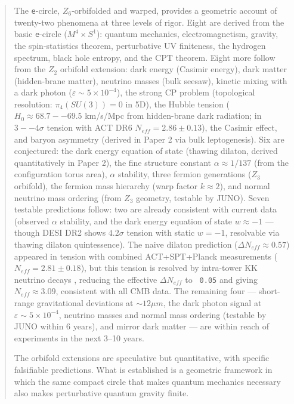 \documentclass[aps,prd,preprint,superscriptaddress,longbibliography,floatfix]{revtex4-2}
\theoremstyle{remark}
\begin{document}
\begin{abstract}
The \texttt{e}-circle, $Z_{6}$-orbifolded and warped, provides a geometric account of twenty-two phenomena at three levels of rigor. Eight are derived from the basic \texttt{e}-circle ($M^{4} \times S^{1}$): quantum mechanics, electromagnetism, gravity, the spin-statistics theorem, perturbative UV finiteness, the hydrogen spectrum, black hole entropy, and the CPT theorem. Eight more follow from the $Z_{2}$ orbifold extension: dark energy (Casimir energy), dark matter (hidden-brane matter), neutrino masses (bulk seesaw), kinetic mixing with a dark photon ($\varepsilon \sim  5 \times 10^{-4}$), the strong CP problem (topological resolution: $\pi_{4}(SU(3)) = 0$ in 5D), the Hubble tension ($H_{0} \approx 68.7--69.5$ km/s/Mpc from hidden-brane dark radiation; in $3--4\sigma$ tension with ACT DR6 $N_{eff} = 2.86 \pm 0.13$), the Casimir effect, and baryon asymmetry (derived in Paper 2 via bulk leptogenesis). Six are conjectured: the dark energy equation of state (thawing dilaton, derived quantitatively in Paper 2), the fine structure constant $\alpha \approx 1/137$ (from the configuration torus area), $\alpha$ stability, three fermion generations ($Z_{3}$ orbifold), the fermion mass hierarchy (warp factor $k \approx 2$), and normal neutrino mass ordering (from $Z_{3}$ geometry, testable by JUNO). Seven testable predictions follow: two are already consistent with current data (observed $\alpha$ stability, and the dark energy equation of state $w \approx -1$ --- though DESI DR2 shows $4.2\sigma$ tension with static $w = -1$, resolvable via thawing dilaton quintessence). The naive dilaton prediction ($\Delta N_{eff} \approx 0.57$) appeared in tension with combined ACT+SPT+Planck measurements ($N_{eff} = 2.81 \pm 0.18$), but this tension is resolved by intra-tower KK neutrino decays \cite{GonzaloNeutrinoTowers2024}, reducing the effective $\Delta N_{eff}$ to \texttt{~0.05} and giving $N_{eff} \approx 3.09$, consistent with all CMB data. The remaining four --- short-range gravitational deviations at $\sim 12 \mu m$, the dark photon signal at $\varepsilon \sim  5 \times 10^{-4}$, neutrino masses and normal mass ordering (testable by JUNO within 6 years), and mirror dark matter --- are within reach of experiments in the next 3--10 years.

The orbifold extensions are speculative but quantitative, with specific falsifiable predictions. What is established is a geometric framework in which the same compact circle that makes quantum mechanics necessary also makes perturbative quantum gravity finite.


\end{abstract}
\end{document}
